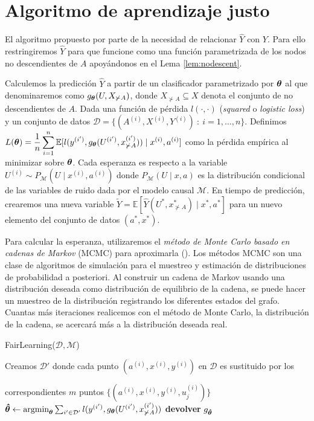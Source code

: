 \documentclass[oneside,openright,titlepage,numbers=noenddot,openany,headinclude,footinclude=true,
cleardoublepage=empty,abstractoff,BCOR=5mm,paper=a4,fontsize=12pt,main=spanish]{scrreprt}
\begin{document}
\section{Algoritmo de aprendizaje justo}

\label{sec:algoritmo}

El algoritmo propuesto por \cite{counterfactual2018} parte de la necesidad de relacionar $\hat{Y}$ con $Y$. Para ello restringiremos $\hat{Y}$ para que funcione como una función parametrizada de los nodos no descendientes de $A$ apoyándonos en el Lema \ref{lem:nodescent}. 

Calculemos la predicción $\hat{Y}$ a partir de un clasificador parametrizado por $\bm{\theta}$ al que denominaremos como $g_{\bm{\theta}}(U,X_{\not \succ A})$, donde $X_{\not \succ A} \subseteq X$ denota el conjunto de no descendientes de $A$. Dada una función de pérdida $l(\cdot,\cdot)$ (\textit{squared} o \textit{logistic loss}) y un conjunto de datos $\mathcal{D}=\{(A^{(i)},X^{(i)},Y^{(i)}) \ : \ i=1,\dots,n\}$. Definimos $L(\bm{\theta})=\displaystyle \frac{1}{n} \sum_{i=1}^n \mathbb{E}[l(y^{(i')},g_{\bm{\theta}}(U^{(i')},x_{\not \succ A}^{(i')}))\mid x^{(i)},a^{(i)}]$ como la pérdida empírica al minimizar sobre $\bm{\theta}$. Cada esperanza es respecto a la variable $U^{(i)} \sim P_{\mathcal{M}}(U \mid x^{(i)},a^{(i)})$ donde $P_{\mathcal{M}}(U \mid x,a)$ es la distribución condicional de las variables de ruido dada por el modelo causal $\mathcal{M}$. En tiempo de predicción, crearemos una nueva variable $\tilde{Y}=\mathbb{E}[\hat{Y}(U^\ast,x_{\not \succ A}^\ast)\mid x^\ast, a^\ast]$ para un nuevo elemento del conjunto de datos $(a^\ast,x^\ast)$. 

Para calcular la esperanza, utilizaremos el \textit{método de Monte Carlo basado en cadenas de Markov} (MCMC) para aproximarla (\cite{mcmc2003}). Los métodos MCMC son una clase de algoritmos de simulación para el muestreo y estimación de distribuciones de probabilidad a posteriori. Al construir un cadena de Markov usando una distribución deseada como distribución de equilibrio de la cadena, se puede hacer un muestreo de la distribución registrando los diferentes estados del grafo. Cuantas más iteraciones realicemos con el método de Monte Carlo, la distribución de la cadena, se acercará más a la distribución deseada real.

\begin{algorithm}[h]
\caption{FairLearning($\mathcal{D},\mathcal{M}$)}
\label{alg:fairlearn}
    Creamos $\mathcal{D}'$ donde cada punto $(a^{(i)},x^{(i)},y^{(i)})$ en $\mathcal{D}$ es sustituido por los 
    
    correspondientes $m$ puntos $\{(a^{(i)},x^{(i)},y^{(i)},u_j^{(i)})\}$\;
    $\bm{\hat{\theta}} \leftarrow \text{argmin}_{\bm{\theta}} \sum_{i'\in \mathcal{D}'} l(y^{(i')},g_{\bm{\theta}}(U^{(i')},x_{\not \succ A}^{(i')}))$\;
   \textbf{devolver} $g_{\bm{\hat{\theta}}}$\;
\end{algorithm}
\end{document}
